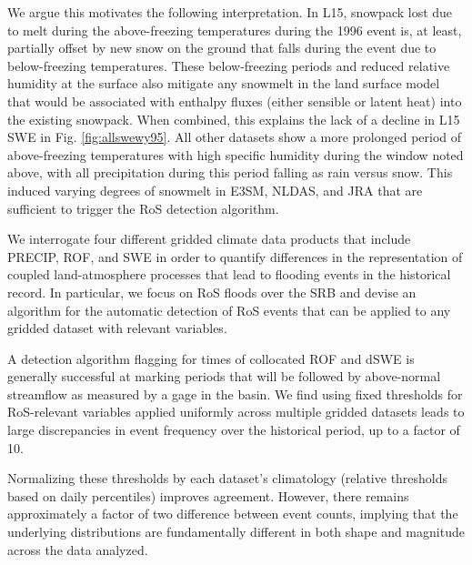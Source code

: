 \documentclass[nhess, manuscript]{copernicus}
\begin{document}
We argue this motivates the following interpretation.
In L15, snowpack lost due to melt during the above-freezing temperatures during the 1996 event is, at least, partially offset by new snow on the ground that falls during the event due to below-freezing temperatures.
These below-freezing periods and reduced relative humidity at the surface also mitigate any snowmelt in the land surface model that would be associated with enthalpy fluxes (either sensible or latent heat) into the existing snowpack.
When combined, this explains the lack of a decline in L15 SWE in Fig. \ref{fig:allswewy95}.
All other datasets show a more prolonged period of above-freezing temperatures with high specific humidity during the window noted above, with all precipitation during this period falling as rain versus snow.
This induced varying degrees of snowmelt in E3SM, NLDAS, and JRA that are sufficient to trigger the RoS detection algorithm.

\conclusions

We interrogate four different gridded climate data products that include PRECIP, ROF, and SWE in order to quantify differences in the representation of coupled land-atmosphere processes that lead to flooding events in the historical record.
In particular, we focus on RoS floods over the SRB and devise an algorithm for the automatic detection of RoS events that can be applied to any gridded dataset with relevant variables.

A detection algorithm flagging for times of collocated ROF and dSWE is generally successful at marking periods that will be followed by above-normal streamflow as measured by a gage in the basin.
We find using fixed thresholds for RoS-relevant variables applied uniformly across multiple gridded datasets leads to large discrepancies in event frequency over the historical period, up to a factor of 10.

Normalizing these thresholds by each dataset's climatology (relative thresholds based on daily percentiles) improves agreement.
However, there remains approximately a factor of two difference between event counts, implying that the underlying distributions are fundamentally different in both shape and magnitude across the data analyzed.

\end{document}
